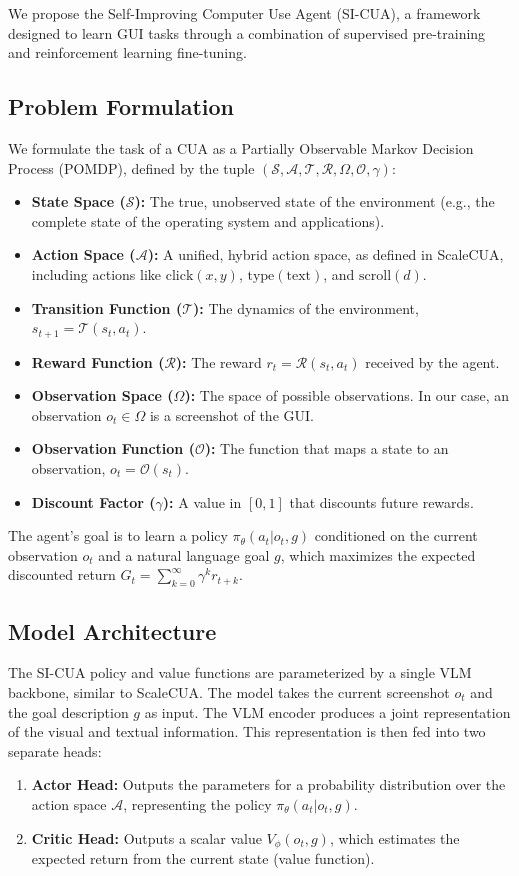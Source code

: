 \documentclass{article}
\begin{document}
We propose the Self-Improving Computer Use Agent (SI-CUA), a framework designed to learn GUI tasks through a combination of supervised pre-training and reinforcement learning fine-tuning.

\subsection{Problem Formulation}
We formulate the task of a CUA as a Partially Observable Markov Decision Process (POMDP), defined by the tuple $(\mathcal{S}, \mathcal{A}, \mathcal{T}, \mathcal{R}, \Omega, \mathcal{O}, \gamma)$:
\begin{itemize}
    \item \textbf{State Space ($\mathcal{S}$):} The true, unobserved state of the environment (e.g., the complete state of the operating system and applications).
    \item \textbf{Action Space ($\mathcal{A}$):} A unified, hybrid action space, as defined in ScaleCUA, including actions like $\text{click}(x, y)$, $\text{type}(\text{text})$, and $\text{scroll}(d)$.
    \item \textbf{Transition Function ($\mathcal{T}$):} The dynamics of the environment, $s_{t+1} = \mathcal{T}(s_t, a_t)$.
    \item \textbf{Reward Function ($\mathcal{R}$):} The reward $r_t = \mathcal{R}(s_t, a_t)$ received by the agent.
    \item \textbf{Observation Space ($\Omega$):} The space of possible observations. In our case, an observation $o_t \in \Omega$ is a screenshot of the GUI.
    \item \textbf{Observation Function ($\mathcal{O}$):} The function that maps a state to an observation, $o_t = \mathcal{O}(s_t)$.
    \item \textbf{Discount Factor ($\gamma$):} A value in $[0, 1]$ that discounts future rewards.
\end{itemize}
The agent's goal is to learn a policy $\pi_\theta(a_t | o_t, g)$ conditioned on the current observation $o_t$ and a natural language goal $g$, which maximizes the expected discounted return $G_t = \sum_{k=0}^{\infty} \gamma^k r_{t+k}$.

\subsection{Model Architecture}
The SI-CUA policy and value functions are parameterized by a single VLM backbone, similar to ScaleCUA. The model takes the current screenshot $o_t$ and the goal description $g$ as input. The VLM encoder produces a joint representation of the visual and textual information. This representation is then fed into two separate heads:
\begin{enumerate}
    \item \textbf{Actor Head:} Outputs the parameters for a probability distribution over the action space $\mathcal{A}$, representing the policy $\pi_\theta(a_t | o_t, g)$.
    \item \textbf{Critic Head:} Outputs a scalar value $V_\phi(o_t, g)$, which estimates the expected return from the current state (value function).
\end{enumerate}
\end{document}
